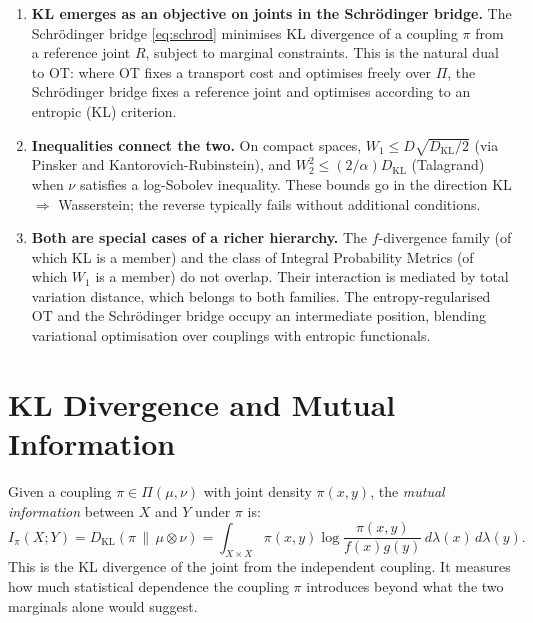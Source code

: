 \documentclass[12pt]{article}
\newcommand{\KL}[2]{D_{\mathrm{KL}}\!\left(#1\,\|\,#2\right)}
\begin{document}
\begin{enumerate}
  \item \textbf{KL emerges as an objective on joints in the
    Schr\"odinger bridge.}  The Schr\"odinger bridge
    \eqref{eq:schrod} minimises KL divergence of a coupling
    $\pi$ from a reference joint $R$, subject to marginal
    constraints.  This is the natural dual to OT: where OT
    fixes a transport cost and optimises freely over $\Pi$,
    the Schr\"odinger bridge fixes a reference joint and
    optimises according to an entropic (KL) criterion.

  \item \textbf{Inequalities connect the two.}  On compact
    spaces, $W_1 \leq D\sqrt{D_{\mathrm{KL}}/2}$ (via Pinsker and
    Kantorovich-Rubinstein), and $W_2^2 \leq (2/\alpha)D_{\mathrm{KL}}$
    (Talagrand) when $\nu$ satisfies a log-Sobolev inequality.
    These bounds go in the direction KL $\Rightarrow$
    Wasserstein; the reverse typically fails without additional
    conditions.

  \item \textbf{Both are special cases of a richer hierarchy.}
    The $f$-divergence family (of which KL is a member) and the
    class of Integral Probability Metrics (of which $W_1$ is a
    member) do not overlap.  Their interaction is mediated by
    total variation distance, which belongs to both families.
    The entropy-regularised OT and the Schr\"odinger bridge
    occupy an intermediate position, blending variational
    optimisation over couplings with entropic functionals.
\end{enumerate}

\appendix

\section{KL Divergence and Mutual Information}
\label{app:mi}

Given a coupling $\pi \in \Pi(\mu,\nu)$ with joint density
$\pi(x,y)$, the \emph{mutual information} between $X$ and $Y$
under $\pi$ is:
\begin{equation}\label{eq:mi}
  I_\pi(X;Y) = \KL{\pi}{\mu\otimes\nu}
  = \int_{X\times X} \pi(x,y)\log
    \frac{\pi(x,y)}{f(x)g(y)}\,d\lambda(x)\,d\lambda(y).
\end{equation}
This is the KL divergence of the joint from the independent
coupling.  It measures how much statistical dependence the
coupling $\pi$ introduces beyond what the two marginals alone
would suggest.
\end{document}
